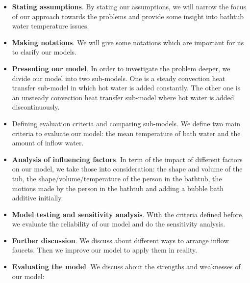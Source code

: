 \documentclass{mcmthesis}
\begin{document}
\begin{itemize}
\item {\bf Stating assumptions}. By stating our assumptions, we will narrow the focus of our approach towards the problems and provide some insight into bathtub water temperature issues.

\item {\bf Making notations}. We will give some notations which are important for us to clarify our models.

\item {\bf Presenting our model}. In order to investigate the problem deeper, we divide our model into two sub-models. One is a steady convection heat transfer sub-model in which hot water is added constantly. The other one is an unsteady convection heat transfer sub-model where hot water is added discontinuously.

\item {Defining evaluation criteria and comparing sub-models}. We define two main criteria to evaluate our model: the mean temperature of bath water and the amount of inflow water.

\item {\bf Analysis of influencing factors}. In term of the impact of different factors on our model, we take those into consideration: the shape and volume of the tub, the shape/volume/temperature of the person in the bathtub, the motions made by the person in the bathtub and adding a bubble bath additive initially.

\item {\bf Model testing and sensitivity analysis}. With the criteria defined before, we evaluate the reliability of our model and do the sensitivity analysis.

\item {\bf Further discussion}. We discuss about different ways to arrange inflow faucets. Then we improve our model to apply them in reality.

\item {\bf Evaluating the model}. We discuss about the strengths and weaknesses of our model:



\end{itemize}
\end{document}
